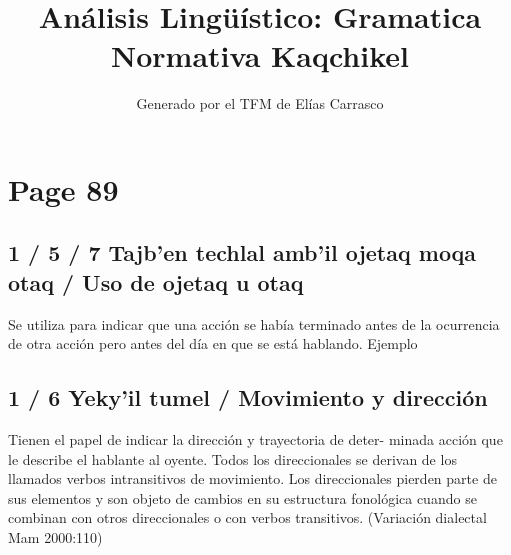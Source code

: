 \documentclass{article}%
\title{Análisis Lingüístico: Gramatica Normativa Kaqchikel}%
\author{Generado por el TFM de Elías Carrasco}%
\begin{document}
%
\normalsize%
\maketitle%
\section{Page 89}%
\label{sec:Page89}%
\subsection{1 / 5 / 7 Tajb’en techlal amb’il ojetaq moqa otaq / Uso de ojetaq u otaq}%
\label{subsec:1/5/7Tajbentechlalambilojetaqmoqaotaq/Usodeojetaquotaq}%

%
Se utiliza para indicar que una acción se había terminado antes %
de la ocurrencia de otra acción pero antes del día en que se %
está hablando. %
Ejemplo %
\subsection{1 / 6 Yeky’il tumel / Movimiento y dirección}%
\label{subsec:1/6Yekyiltumel/Movimientoydireccin}%

%
Tienen el papel de indicar la dirección y trayectoria de deter{-} %
minada acción que le describe el hablante al oyente. Todos los %
direccionales se derivan de los llamados verbos intransitivos de %
movimiento. Los direccionales pierden parte de sus elementos %
y son objeto de cambios en su estructura fonológica cuando %
se combinan con otros direccionales o con verbos transitivos. %
(Variación dialectal Mam 2000:110) 

%
\end{document}
